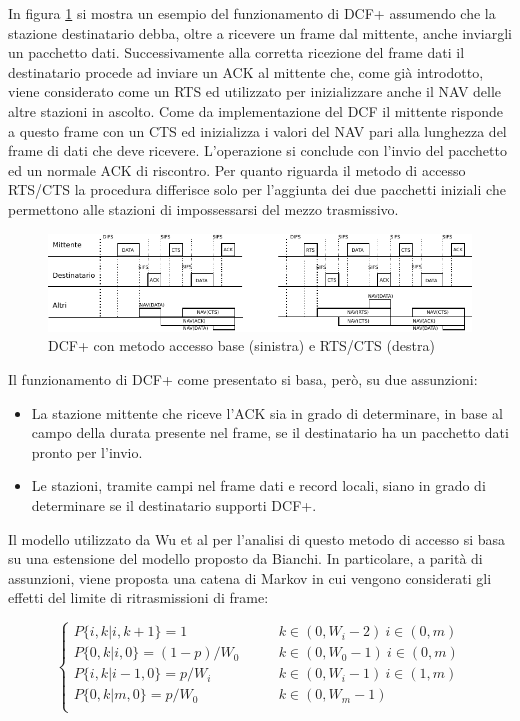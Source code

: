 In figura \ref{fig:dcf+ex} si mostra un esempio del funzionamento di DCF+ assumendo che la stazione destinatario debba, oltre a ricevere un frame dal mittente, anche inviargli un pacchetto dati.
Successivamente alla corretta ricezione del frame dati il destinatario procede ad inviare un ACK al mittente che, come gi\`a introdotto, viene considerato come un RTS ed utilizzato per inizializzare anche il NAV delle altre stazioni in ascolto. 
Come da implementazione del DCF il mittente risponde a questo frame con un CTS ed inizializza i valori del NAV pari alla lunghezza del frame di dati che deve ricevere.
L'operazione si conclude con l'invio del pacchetto ed un normale ACK di riscontro.
Per quanto riguarda il metodo di accesso RTS/CTS la procedura differisce solo per l'aggiunta dei due pacchetti iniziali che permettono alle stazioni di impossessarsi del mezzo trasmissivo.

\begin{figure}[!htb]
	\centering
	\includegraphics{images/img2.pdf}
	\caption{DCF+ con metodo accesso base (sinistra) e RTS/CTS (destra)}
	\label{fig:dcf+ex}
\end{figure}

Il funzionamento di DCF+ come presentato si basa, per\`o, su due assunzioni:

\begin{itemize}
	\item La stazione mittente che riceve l'ACK sia in grado di determinare, in base al campo della durata presente nel frame, se il destinatario ha un pacchetto dati pronto per l'invio.
	\item Le stazioni, tramite campi nel frame dati e record locali, siano in 		grado di determinare se il destinatario supporti DCF+.
\end{itemize}

Il modello utilizzato da Wu et al per l'analisi di questo metodo di accesso si basa su una estensione del modello proposto da Bianchi.
In particolare, a parit\`a di assunzioni, viene proposta una catena di Markov in cui vengono considerati gli effetti del limite di ritrasmissioni di frame:

$$
\begin{cases}
  P \{ i, k| i, k + 1\}  =1 	 &\qquad k \in (0, W_{i}-2) \ i \in (0,m) \\ 
  P \{ 0, k| i, 0\}  =(1-p)/W_{0} 	 &\qquad k \in (0, W_{0}-1) \ i \in (0,m) \\ 
  P \{ i, k| i-1, 0\}  =p/W_{i} 	 &\qquad k \in (0, W_{i}-1) \ i \in (1,m) \\ 
  P \{ 0, k| m, 0\}  =p/W_{0} 	 &\qquad k \in (0, W_{m}-1) \\
\end{cases}
$$

